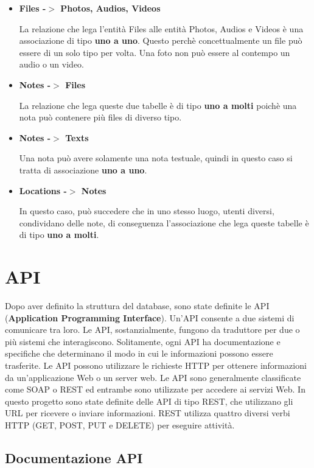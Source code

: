 \begin{itemize}
	\item \textbf{Files -$>$ Photos, Audios, Videos}
	
	La relazione che lega l'entità Files alle entità Photos, Audios e Videos è una associazione di tipo \textbf{uno a uno}. Questo perchè concettualmente un file può essere di un solo tipo per volta. Una foto non può essere al contempo un audio o un video.
	
	\item \textbf{Notes -$>$ Files}
	
	La relazione che lega queste due tabelle è di tipo \textbf{uno a molti} poichè una nota può contenere più files di diverso tipo.
	
	\item \textbf{Notes -$>$ Texts}
	
	Una nota può avere solamente una nota testuale, quindi in questo caso si tratta di associazione \textbf{uno a uno}.
	
	\item \textbf{Locations -$>$ Notes}
	
	In questo caso, può succedere che in uno stesso luogo, utenti diversi, condividano delle note, di conseguenza l'associazione che lega queste tabelle è di tipo \textbf{uno a molti}. 
\end{itemize}


\section{API}

Dopo aver definito la struttura del database, sono state definite le API (\textbf{Application Programming Interface}). Un'API consente a due sistemi di comunicare tra loro. Le API, sostanzialmente, fungono da traduttore per due o più sistemi che interagiscono. Solitamente, ogni API ha documentazione e specifiche che determinano il modo in cui le informazioni possono essere trasferite.
Le API possono utilizzare le richieste HTTP per ottenere informazioni da un'applicazione Web o un server web. Le API sono generalmente classificate come SOAP o REST ed entrambe sono utilizzate per accedere ai servizi Web. In questo progetto sono state definite delle API di tipo REST, che utilizzano gli URL per ricevere o inviare informazioni. REST utilizza quattro diversi verbi HTTP (GET, POST, PUT e DELETE) per eseguire attività.

\subsection{Documentazione API}
\label{sec:APIDoc}


